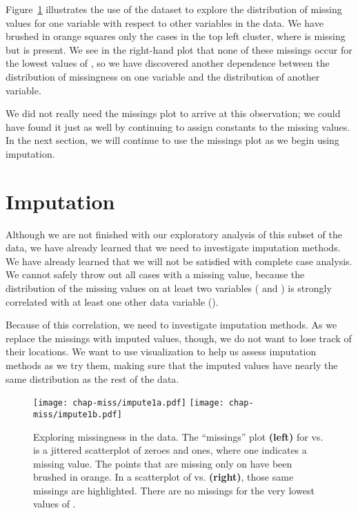 Figure~\ref{miss-data} illustrates the use of the  dataset
to explore the distribution of missing values for one variable with
respect to other variables in the data.  We have brushed in orange
squares only the cases in the top left cluster, where  is missing but  is present.  We see in the
right-hand plot that none of these missings occur for the lowest
values of , so we have discovered another dependence
between the distribution of missingness on one variable and the
distribution of another variable.

We did not really need the missings plot to arrive at this observation;
we could have found it just as well by continuing to assign
constants to the missing values.  In the next section, we will continue
to use the missings plot as we begin using imputation.

\section{Imputation}\label{miss-impute}

Although we are not finished with our exploratory analysis of this subset
of the  data, we have already learned that we need to
investigate imputation methods.  We have already learned that we will not
be satisfied with complete case analysis.  We cannot safely throw out
all cases with a missing value, because the distribution of the missing
values on at least two variables ( and )
is strongly correlated with at least one other data variable
().

Because of this correlation, we need to investigate imputation
methods.  As we replace the missings with imputed values, though, we
do not want to lose track of their locations.  We want to use
visualization to help us assess imputation methods as we try them,
making sure that the imputed values have nearly the same distribution
as the rest of the data.

\begin{figure}[htbp]
\centerline{\texttt{[image: chap-miss/impute1a.pdf]}
            \texttt{[image: chap-miss/impute1b.pdf]}
}
\caption[Exploring missingness in the  data]{Exploring
missingness in the  data.  The ``missings'' plot {\bf
(left)} for  vs.  is a jittered
scatterplot of zeroes and ones, where one indicates a missing value.
The points that are missing only on  have been
brushed in orange.  In a scatterplot of  vs. 
{\bf (right)}, those same missings are highlighted.  There are no
missings for the very lowest values of .}
\label{miss-data}
\end{figure}

